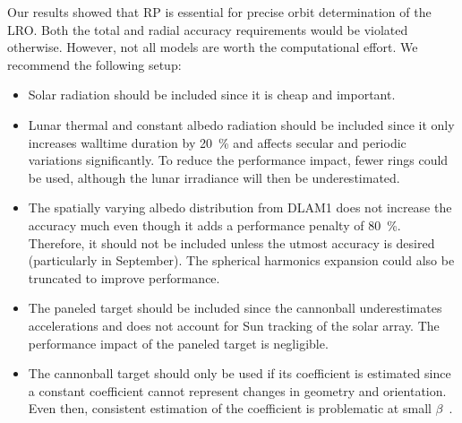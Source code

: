 Our results showed that \gls{RP} is essential for precise orbit determination of the \gls{LRO}. Both the total and radial accuracy requirements would be violated otherwise. However, not all models are worth the computational effort. We recommend the following setup:
\begin{itemize}
    \item Solar radiation should be included since it is cheap and important.
    \item Lunar thermal and constant albedo radiation should be included since it only increases walltime duration by \qty{20}{\percent} and affects secular and periodic variations significantly. To reduce the performance impact, fewer rings could be used, although the lunar irradiance will then be underestimated.
    \item The spatially varying albedo distribution from \gls{DLAM1} does not increase the accuracy much even though it adds a performance penalty of \qty{80}{\percent}. Therefore, it should not be included unless the utmost accuracy is desired (particularly in September). The spherical harmonics expansion could also be truncated to improve performance.
    \item The paneled target should be included since the cannonball underestimates accelerations and does not account for Sun tracking of the solar array. The performance impact of the paneled target is negligible.
    \item The cannonball target should only be used if its coefficient is estimated since a constant coefficient cannot represent changes in geometry and orientation. Even then, consistent estimation of the coefficient is problematic at small $\beta$~\cite{Slojkowski2014}.
\end{itemize}

